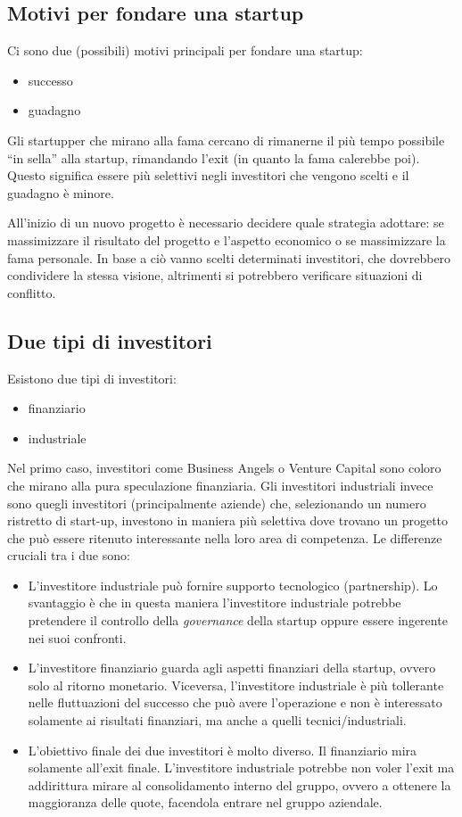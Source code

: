 \subsection{Motivi per fondare una startup}
Ci sono due (possibili) motivi principali per fondare una startup:
\begin{itemize}
 \item successo
 \item guadagno
\end{itemize}

Gli startupper che mirano alla fama cercano di rimanerne il più tempo possibile
``in sella'' alla startup, rimandando l'exit (in quanto la fama calerebbe poi).
Questo significa essere più selettivi negli investitori che vengono scelti e
il guadagno è minore.

All'inizio di un nuovo progetto è necessario decidere quale strategia adottare:
se massimizzare il risultato del progetto e l'aspetto economico o se
massimizzare la fama personale. In base a ciò vanno scelti determinati
investitori, che dovrebbero condividere la stessa visione, altrimenti si
potrebbero verificare situazioni di conflitto.

\subsection{Due tipi di investitori}

Esistono due tipi di investitori:
\begin{itemize}
 \item finanziario
 \item industriale
\end{itemize}
Nel primo caso, investitori come Business Angels o Venture Capital sono coloro
che mirano alla pura speculazione finanziaria. Gli investitori industriali
invece sono quegli investitori (principalmente aziende) che, selezionando un
numero ristretto di start-up, investono in maniera più selettiva dove trovano
un progetto che può essere ritenuto interessante nella loro area di competenza.
Le differenze cruciali tra i due sono:
\begin{itemize}
 \item L'investitore industriale può fornire supporto tecnologico
(partnership). Lo svantaggio è che in questa maniera l'investitore industriale
potrebbe pretendere il controllo della \textit{governance} della startup oppure
essere ingerente nei suoi confronti.
 \item L'investitore finanziario guarda agli aspetti finanziari della startup,
ovvero solo al ritorno monetario. Viceversa, l'investitore industriale è più
tollerante nelle fluttuazioni del successo che può avere l'operazione e non è
interessato solamente ai risultati finanziari, ma anche a quelli
tecnici/industriali.
 \item L'obiettivo finale dei due investitori è molto diverso. Il finanziario
mira solamente all'exit finale. L'investitore industriale potrebbe non voler
l'exit ma addirittura mirare al consolidamento interno del gruppo, ovvero
a ottenere la maggioranza delle quote, facendola entrare nel gruppo aziendale.
\end{itemize}

